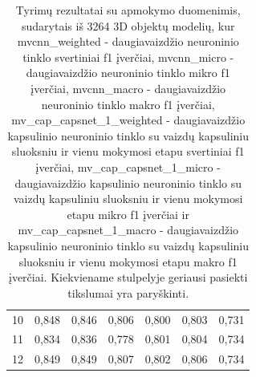 \begin{table}[]
\begin{tabular}{l|l|l|l|l|l|l}
		10 &          0,848 &       0,846 &       0,806 &                     0,800 &                  0,803 &                  0,731 \\
		11 &          0,834 &       0,836 &       0,778 &                     0,801 &                  0,804 &                  0,734 \\
		12 &          0,849 &       0,849 &       0,807 &                     0,802 &                  0,806 &                  0,734 \\
	\end{tabular}
	\caption{
		Tyrimų rezultatai su apmokymo duomenimis, sudarytais iš 3264 3D objektų modelių, kur mvcnn\_weighted -  daugiavaizdžio neuroninio tinklo svertiniai f1 įverčiai, 
		mvcnn\_micro -  daugiavaizdžio neuroninio tinklo mikro f1 įverčiai, 
		mvcnn\_macro -  daugiavaizdžio neuroninio tinklo makro f1 įverčiai, 
		mv\_cap\_capsnet\_1\_weighted - daugiavaizdžio kapsulinio neuroninio tinklo su vaizdų kapsuliniu sluoksniu ir vienu mokymosi etapu svertiniai f1 įverčiai, 
		mv\_cap\_capsnet\_1\_micro - daugiavaizdžio kapsulinio neuroninio tinklo su vaizdų kapsuliniu sluoksniu ir vienu mokymosi etapu mikro f1 įverčiai ir
		mv\_cap\_capsnet\_1\_macro - daugiavaizdžio kapsulinio neuroninio tinklo su vaizdų kapsuliniu sluoksniu ir vienu mokymosi etapu makro f1 įverčiai. Kiekviename stulpelyje geriausi pasiekti tikslumai yra paryškinti.
	}
	\label{tbl:3rd_sample_f1}
\end{table}


